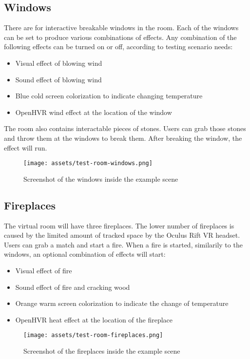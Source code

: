 \hypertarget{x-windows}{\subsection{Windows}}
There are for interactive breakable windows in the room. Each of the
windows can be set to produce various combinations of effects. Any combination
of the following effects can be turned on or off, according to testing
scenario needs:

\begin{itemize}
\item Visual effect of blowing wind
\item Sound effect of blowing wind
\item Blue cold screen colorization to indicate changing temperature
\item OpenHVR wind effect at the location of the window
\end{itemize}

The room also contains interactable pieces of stones. Users can grab those
stones and throw them at the windows to break them. After breaking the window,
the effect will run.

\begin{figure}[h]{}
\centering\texttt{[image: assets/test-room-windows.png]}
\caption{Screenshot of the windows inside the example scene}

\end{figure}

\hypertarget{x-fireplaces}{\subsection{Fireplaces}}
The virtual room will have three fireplaces. The lower number of fireplaces 
is caused by the limited amount of tracked space by the Oculus Rift VR headset.
Users can grab a match and start a fire. 
When a fire is started, similarily to the windows, an optional
combination of effects will start:

\begin{itemize}
\item Visual effect of fire
\item Sound effect of fire and cracking wood
\item Orange warm screen colorization to indicate the change of temperature
\item OpenHVR heat effect at the location of the fireplace
\end{itemize}

\begin{figure}[h]{}
\centering\texttt{[image: assets/test-room-fireplaces.png]}
\caption{Screenshot of the fireplaces inside the example scene}

\end{figure}